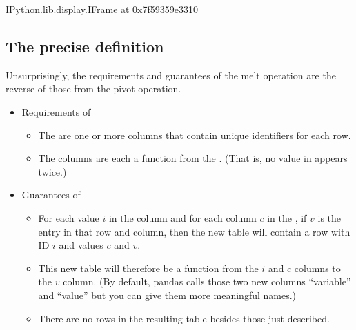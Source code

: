 \documentclass[letterpaper,10pt,english]{jupyterBook}
\begin{document}
\begin{sphinxVerbatim}[commandchars=\\\{\}]
\PYGZlt{}IPython.lib.display.IFrame at 0x7f59359e3310\PYGZgt{}
\end{sphinxVerbatim}


\subsection{The precise definition}
\label{\detokenize{chapter-6-single-table-verbs:id1}}
\sphinxAtStartPar
Unsurprisingly, the requirements and guarantees of the melt operation are the reverse of those from the pivot operation.
\begin{itemize}
\item {} 
\sphinxAtStartPar
Requirements of 
\begin{itemize}
\item {} 
\sphinxAtStartPar
The  are one or more columns that contain unique identifiers for each row.

\item {} 
\sphinxAtStartPar
The  columns are each a function from the .  (That is, no value in  appears twice.)

\end{itemize}

\item {} 
\sphinxAtStartPar
Guarantees of 
\begin{itemize}
\item {} 
\sphinxAtStartPar
For each value \(i\) in the  column and for each column \(c\) in the , if \(v\) is the entry in that row and column, then the new table will contain a row with ID \(i\) and values \(c\) and \(v\).

\item {} 
\sphinxAtStartPar
This new table will therefore be a function from the \(i\) and \(c\) columns to the \(v\) column.  (By default, pandas calls those two new columns “variable” and “value” but you can give them more meaningful names.)

\item {} 
\sphinxAtStartPar
There are no rows in the resulting table besides those just described.

\end{itemize}

\end{itemize}
\end{document}
